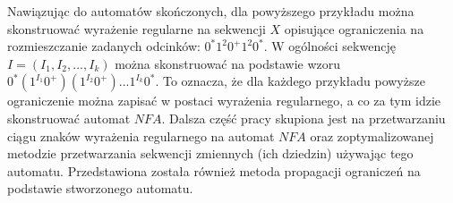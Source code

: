 \par
Nawiązując do automatów skończonych, dla powyższego przykładu można skonstruować wyrażenie regularne na sekwencji $X$
opisujące ograniczenia na rozmieszczanie zadanych odcinków: $ 0^{*} 1^2 0^{+} 1^2 0^{*} $. W ogólności sekwencję
$I = (I_1, I_2, ..., I_k)$ można skonstruować na podstawie wzoru
$ 0^{*} (1^{I_1} 0^{+}) (1^{I_2} 0^{+}) ... 1^{I_k} 0^{*} $. To oznacza, że dla każdego przykładu powyższe ograniczenie
można zapisać w postaci wyrażenia regularnego, a co za tym idzie skonstruować automat $NFA$. Dalsza część pracy skupiona
jest na przetwarzaniu ciągu znaków wyrażenia regularnego na automat $NFA$ oraz zoptymalizowanej metodzie przetwarzania
sekwencji zmiennych (ich dziedzin) używając tego automatu. Przedstawiona została również metoda propagacji
ograniczeń na podstawie stworzonego automatu.
